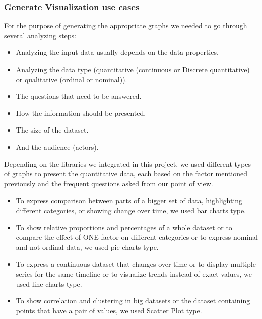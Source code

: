 \subsubsection*{Generate Visualization use cases}
For the purpose of generating the appropriate graphs we needed to go through several analyzing steps:
\begin{itemize}
\renewcommand{\labelitemi}{$\bullet$}
\item Analyzing the input data usually depends on the data properties.
\item Analyzing the data type (quantitative (continuous or Discrete quantitative) or qualitative (ordinal or nominal)).
\item The questions that need to be answered.
\item How the information should be presented.
\item The size of the dataset.
\item And the audience (actors).
\end{itemize}

\bigbreak
Depending on the libraries we integrated in this project, we used different types of graphs to present the quantitative data, each based on the factor mentioned previously and the frequent questions asked from our point of view.
\begin{itemize}
  \renewcommand{\labelitemi}{$\bullet$}
  \item To express comparison between parts of a bigger set of data, highlighting different categories, or showing change over time, we used bar charts type.
  \item To show relative proportions and percentages of a whole dataset or to compare the effect of ONE factor on different categories or to express nominal and not ordinal data, we used pie charts type. 
  \item To express a continuous dataset that changes over time or to display multiple series for the same timeline or to visualize trends instead of exact values, we used line charts type.
\item To show correlation and clustering in big datasets or the dataset containing points that have a pair of values, we used Scatter Plot type.
\end{itemize}


